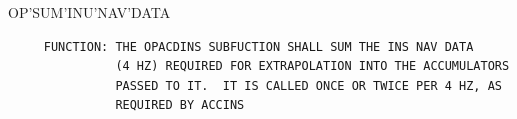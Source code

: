 \begin{frame}
OP'SUM'INU'NAV'DATA
\begin{verbatim}
     FUNCTION: THE OPACDINS SUBFUCTION SHALL SUM THE INS NAV DATA
               (4 HZ) REQUIRED FOR EXTRAPOLATION INTO THE ACCUMULATORS
               PASSED TO IT.  IT IS CALLED ONCE OR TWICE PER 4 HZ, AS
               REQUIRED BY ACCINS

\end{verbatim}
\end{frame}
